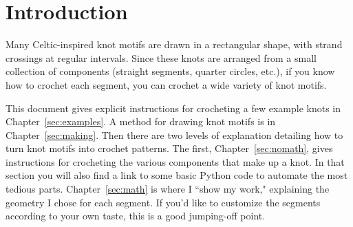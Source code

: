 \documentclass[openany]{book}
\begin{document}
\tableofcontents
\vfill
\begin{center}
\end{center}\vfill

\chapter{Introduction}

Many Celtic-inspired knot motifs are drawn in a rectangular shape, with strand crossings at regular intervals. Since these knots are arranged from a small collection of components (straight segments, quarter circles, etc.), if you know how to crochet each segment, you can crochet a wide variety of knot motifs.

This document gives explicit instructions for crocheting a few example knots in Chapter~\ref{sec:examples}. A method for drawing knot motifs is in Chapter~\ref{sec:making}. Then there are two levels of explanation detailing how to turn knot motifs into crochet patterns. The first, Chapter~\ref{sec:nomath}, gives instructions for crocheting the various components that make up a knot. In that section you will also find a link to some basic Python code to automate the most tedious parts. Chapter~\ref{sec:math} is where I ``show my work," explaining the geometry I chose for each segment.  If you'd like to customize the segments according to your own taste, this is a good jumping-off point.
\end{document}
